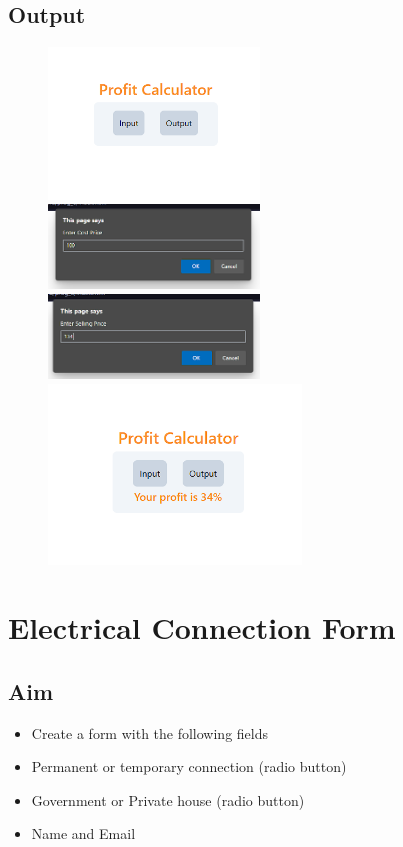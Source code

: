 \documentclass{article}
\begin{document}
\subsection{Output}
\begin{figure}[h!]
	\centering
	\includegraphics[width=0.5\textwidth]{./Assets/p0601.png}
	\includegraphics[width=0.5\textwidth]{./Assets/p0602.png}
	\includegraphics[width=0.5\textwidth]{./Assets/p0603.png}
	\includegraphics[width=0.6\textwidth]{./Assets/p0604.png}
\end{figure}
\newpage

\section{Electrical Connection Form}
\subsection{Aim}
\begin{itemize}
	\item Create a form with the following fields
	\item Permanent or temporary connection (radio button)
	\item Government or Private house (radio button)
	\item Name and Email
\end{itemize}
\end{document}
